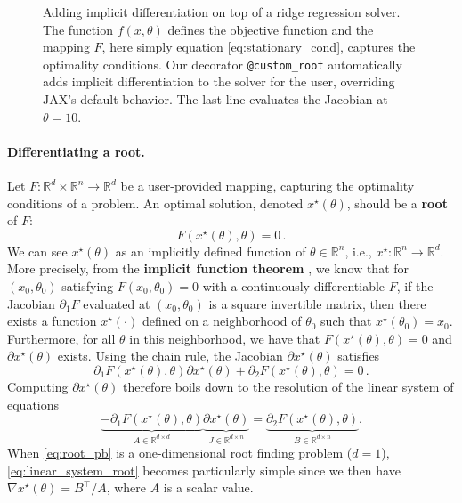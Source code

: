 \documentclass{article}
\def\RR{{\mathbb R}}
\begin{document}
\begin{figure}[t]
\centering
{}
\caption{Adding implicit differentiation on top of a ridge
regression solver. The function $f(x, \theta)$ defines the objective function
and the mapping $F$, here simply equation \eqref{eq:stationary_cond}, captures
the optimality conditions. Our decorator
\texttt{@custom\_root} automatically adds implicit
differentiation to the solver for the user, overriding JAX's default behavior.
The last line evaluates the Jacobian at $\theta = 10$.}
\label{fig:ridge}
\end{figure}

\paragraph{Differentiating a root.}

Let $F \colon \RR^d \times \RR^n \to \RR^d$ be a user-provided mapping,
capturing the optimality conditions of a problem. 
An optimal solution, denoted $x^\star(\theta)$, should be a
\textbf{root} of $F$:
\begin{equation}
F(x^\star(\theta), \theta) = 0\,.
\label{eq:root_pb}
\end{equation}
We can see $x^\star(\theta)$ as an implicitly defined function of $\theta \in
\RR^n$, i.e., $x^\star \colon \RR^n \to \RR^d$.
More precisely, from the \textbf{implicit function theorem}
\cite{griewank_2008,krantz_2012}, we know that for $(x_0, \theta_0)$ satisfying $F(x_0,
\theta_0) = 0$ with a continuously differentiable $F$, if the Jacobian
$\partial_1 F$ evaluated at $(x_0, \theta_0)$ is a square invertible matrix,
then there exists a function $x^\star(\cdot)$ defined on a neighborhood of
$\theta_0$ such that $x^\star(\theta_0) = x_0$. Furthermore, for all $\theta$ in this
neighborhood, we have that $F(x^\star(\theta), \theta) = 0$ and
$\partial x^\star(\theta)$ exists.
Using the chain rule, the Jacobian $\partial x^\star(\theta)$
satisfies
\begin{equation}
\partial_1 F(x^\star(\theta), \theta) \partial x^\star(\theta) + 
\partial_2 F(x^\star(\theta), \theta) = 0\,.
\end{equation}
Computing $\partial x^\star(\theta)$ therefore boils down to the resolution of
the linear system of equations
\begin{equation}
\underbrace{-\partial_1 F(x^\star(\theta), \theta)}_{A \in \RR^{d \times d}} 
\underbrace{\partial x^\star(\theta)}_{J \in \RR^{d \times n}}
= \underbrace{\partial_2 F(x^\star(\theta), \theta)}_{B \in \RR^{d \times n}}.
\label{eq:linear_system_root}
\end{equation}
When \eqref{eq:root_pb} is a one-dimensional root finding problem ($d=1$),
\eqref{eq:linear_system_root} becomes particularly simple since we then have
$\nabla x^\star(\theta) = B^\top / A$, where $A$ is a scalar value.
\end{document}
